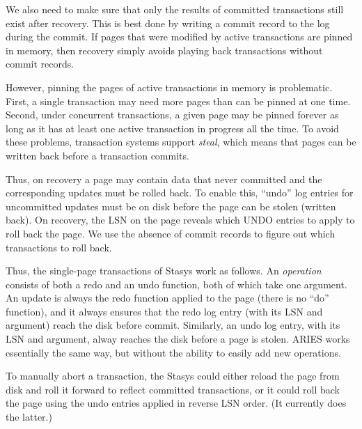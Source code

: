\documentclass[letterpaper,twocolumn,10pt]{article}
\newcommand{\yad}{Stasys\xspace}
\begin{document}
We also need to make sure that only the results of committed
transactions still exist after recovery.  This is best done by writing
a commit record to the log during the commit.  If pages that were
modified by active transactions are pinned in memory, then recovery
simply avoids playing back transactions without commit records.

However, pinning the pages of active transactions in memory is problematic.
First, a single transaction may need more pages than can be pinned at
one time. Second, under concurrent transactions, a given page may be
pinned forever as long as it has at least one active transaction in
progress all the time.  To avoid these problems, transaction systems
support {\em steal}, which means that pages can be written back
before a transaction commits. 

Thus, on recovery a page may contain data that never committed and the
corresponding updates must be rolled back.  To enable this, ``undo'' log
entries for uncommitted updates must be on disk before the page can be
stolen (written back).  On recovery, the LSN on the page reveals which
UNDO entries to apply to roll back the page. We use the absence of
commit records to figure out which transactions to roll back.

Thus, the single-page transactions of \yad work as follows.  An {\em
operation} consists of both a redo and an undo function, both of which
take one argument. An update is always the redo function applied to
the page (there is no ``do'' function), and it always ensures that the
redo log entry (with its LSN and argument) reach the disk before
commit.  Similarly, an undo log entry, with its LSN and argument,
alway reaches the disk before a page is stolen.  ARIES works
essentially the same way, but without the ability to easily add new
operations.

To manually abort a transaction, the \yad could either reload the page
from disk and roll it forward to reflect committed transactions, or it
could roll back the page using the undo entries applied in reverse LSN
order. (It currently does the latter.)
\end{document}
